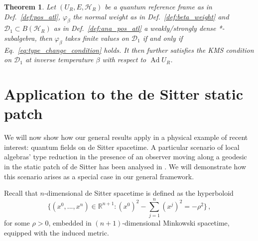 \documentclass[sn-mathphys-num]{sn-jnl}%
\newcommand{\RR}{\mathbb{R}}
\newcommand{\HH}{\mathcal{H}}
\DeclareMathOperator{\Ad}{Ad}
\numberwithin{equation}{section}
\theoremstyle{thmstyleone}%
\newtheorem{theorem}{Theorem}[section]%
\theoremstyle{thmstyletwo}%
\theoremstyle{thmstylethree}%
\begin{document}
\begin{theorem}\label{thm:KMS_weight}
    Let $(U_R,E,\HH_R)$ be a quantum reference frame as in Def.\ \ref{def:pos_atl}, $\varphi_\beta$ the normal weight as in Def.\ \ref{def:beta_weight} and $\mathcal{D}_1\subset B(\HH_R)$ as in Def.\ \ref{def:ana_pos_atl} a weakly/strongly dense *-subalgebra, then $\varphi_\beta$ takes finite values on $\mathcal{D}_1$ if and only if Eq.\ \eqref{eq:type_change_condition} holds. It then further satisfies the KMS condition on $\mathcal{D}_1$ at inverse temperature $\beta$ with respect to $\Ad U_R$.
\end{theorem}

\section{Application to the de Sitter static patch}
\label{sec: deSitter}

We will now show how our general results apply in a physical example of recent interest: quantum fields on de Sitter spacetime. A particular scenario of local algebras' type reduction in the presence of an observer moving along a geodesic in the static patch of de Sitter has been analysed in \cite{chandrasekaran2023algebra}. We will demonstrate how this scenario arises as a special case in our general framework.

Recall that $n$-dimensional de Sitter spacetime is defined as the  hyperboloid 
\begin{equation}
    \{(x^0,...,x^n)\in \RR^{n+1}:(x^0)^2-\sum_{j=1}^n (x^j)^2 =-\rho^2\}\,,
\end{equation}
for some $\rho>0$, embedded in $(n+1)$-dimensional Minkowski spacetime, equipped with the induced metric. 
\end{document}
